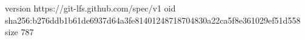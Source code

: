 version https://git-lfs.github.com/spec/v1
oid sha256:b276ddb1b61de6937d64a3fe81401248718704830a22ca5f8e361029ef51d558
size 787
